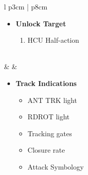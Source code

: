 \documentclass[8pt,usenames,dvipsnames,twoside]{article}
\begin{document}
\begin{center}
\begin{longtable}{l p{3cm} | p{8cm}}
\begin{minipage}[t]{\linewidth}
\begin{itemize}
						\item \textbf{Unlock Target}
						\begin{enumerate}[label=(\alph*), resume]
							\item HCU Half-action
						\end{enumerate}
					\end{itemize}
				\end{minipage} \\
				\midrule
				\textbullet &  & 
				\begin{minipage}[t]{\linewidth}
					\vspace{-7pt}
					\begin{itemize}
						\item \textbf{Track Indications}
						\begin{itemize}
							\item ANT TRK light
							\item RDROT light
							\item Tracking gates
							\item Closure rate 
							\item Attack Symbology
						\end{itemize}
					\end{itemize}
				\end{minipage} \\
				\bottomrule
			\end{longtable}
		\end{center}
	
		\clearpage
		
\end{document}
